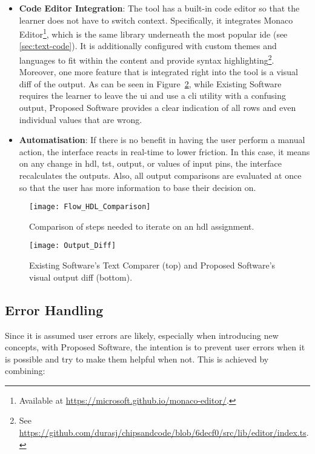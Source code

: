 \begin{itemize}
    \item \textbf{Code Editor Integration}: The tool has a built-in code editor so that the learner does not have to switch context. Specifically, it integrates Monaco Editor\footnote{Available at \url{https://microsoft.github.io/monaco-editor/}.}, which is the same library underneath the most popular \gls{ide} (see \autoref{sec:text-code}). It is additionally configured with custom themes and languages to fit within the content and provide syntax highlighting\footnote{See \url{https://github.com/durasj/chipsandcode/blob/6decf0/src/lib/editor/index.ts}.}. Moreover, one more feature that is integrated right into the tool is a visual diff of the output. As can be seen in Figure~\ref{fig:design-diff}, while Existing Software requires the learner to leave the \gls{ui} and use a \gls{cli} utility with a confusing output, Proposed Software provides a clear indication of all rows and even individual values that are wrong.
    \item \textbf{Automatisation}: If there is no benefit in having the user perform a manual action, the interface reacts in real-time to lower friction. In this case, it means on any change in \gls{hdl}, \gls{tst}, output, or values of input pins, the interface recalculates the outputs. Also, all output comparisons are evaluated at once so that the user has more information to base their decision on.
\end{itemize}

\begin{figure}[H]
    \centering
    \texttt{[image: Flow\_HDL\_Comparison]}
    \caption{Comparison of steps needed to iterate on an \gls{hdl} assignment.}
    \label{fig:design-hdl-steps}
\end{figure}

\begin{figure}[H]
    \centering
    \texttt{[image: Output\_Diff]}
    \caption{Existing Software's Text Comparer (top) and Proposed Software's visual output diff (bottom).}
    \label{fig:design-diff}
\end{figure}

\subsection{Error Handling}

Since it is assumed user errors are likely, especially when introducing new concepts, with Proposed Software, the intention is to prevent user errors when it is possible and try to make them helpful when not.
This is achieved by combining:


